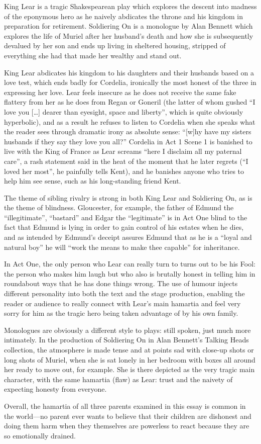 \documentclass{article}
\begin{document}
King Lear is a tragic Shakespearean play which explores the descent into madness of the eponymous hero as he naively abdicates the throne and his kingdom in preparation for retirement.  Soldiering On is a monologue by Alan Bennett which explores the life of Muriel after her husband's death and how she is subsequently devalued by her son and ends up living in sheltered housing, stripped of everything she had that made her wealthy and stand out.

King Lear abdicates his kingdom to his daughters and their husbands based on a love test, which ends badly for Cordelia, ironically the most honest of the three in expressing her love.  Lear feels insecure as he does not receive the same fake flattery from her as he does from Regan or Goneril (the latter of whom gushed ``I love you [\ldots] dearer than eyesight, space and liberty'', which is quite obviously hyperbolic), and as a result he refuses to listen to Cordelia when she speaks what the reader sees through dramatic irony as absolute sense: ``[w]hy have my sisters husbands if they say they love you all?''  Cordelia in Act 1 Scene 1 is banished to live with the King of France as Lear screams ``here I disclaim all my paternal care'', a rash statement said in the heat of the moment that he later regrets (``I loved her most'', he painfully tells Kent), and he banishes anyone who tries to help him see sense, such as his long-standing friend Kent.

The theme of sibling rivalry is strong in both King Lear and Soldiering On, as is the theme of blindness.  Gloucester, for example, the father of Edmund the ``illegitimate'', ``bastard'' and Edgar the ``legitimate'' is in Act One blind to the fact that Edmund is lying in order to gain control of his estates when he dies, and as intended by Edmund's deceipt assures Edmund that as he is a ``loyal and natural boy'' he will ``work the means to make thee capable'' for inheritance.
 
In Act One, the only person who Lear can really turn to turns out to be his Fool: the person who makes him laugh but who also is brutally honest in telling him in roundabout ways that he has done things wrong.  The use of humour injects different personality into both the text and the stage production, enabling the reader or audience to really connect with Lear's main hamartia and feel very sorry for him as the tragic hero being taken advantage of by his own family.

Monologues are obviously a different style to plays: still spoken, just much more intimately.  In the production of Soldiering On in Alan Bennett's Talking Heads collection, the atmosphere is made tense and at points sad with close-up shots or long shots of Muriel, when she is sat lonely in her bedroom with boxes all around her ready to move out, for example.  She is there depicted as the very tragic main character, with the same hamartia (flaw) as Lear: trust and the naivety of expecting honesty from everyone.

Overall, the hamartia of all three parents examined in this essay is common in the world---no parent ever wants to believe that their children are dishonest and doing them harm when they themselves are powerless to react because they are so emotionally drained.
\end{document}

